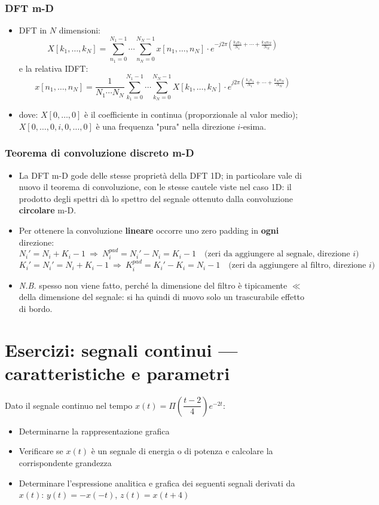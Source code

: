 \documentclass[12pt, a4paper]{article}
\begin{document}
\subsubsection{DFT m-D}
\begin{itemize}
    \item DFT in $N$ dimensioni:
    $$X[k_1,\dots,k_N] = \sum_{n_1=0}^{N_1-1}\cdots\sum_{n_N=0}^{N_N-1} x[n_1,\dots,n_N]\cdot e^{-j2\pi\left(\frac{k_1n_1}{N_1}+\cdots+\frac{k_Nn_N}{N_N}\right)}$$
    e la relativa IDFT:
    $$x[n_1,\dots,n_N] = \frac{1}{N_1\cdots N_N}\sum_{k_1=0}^{N_1-1}\cdots\sum_{k_N=0}^{N_N-1} X[k_1,\dots,k_N]\cdot e^{j2\pi\left(\frac{k_1n_1}{N_1}+\cdots+\frac{k_Nn_N}{N_N}\right)}$$
    \item dove: $X[0,\dots,0]$ è il coefficiente in continua (proporzionale al valor medio); $X[0,\dots,0,i,0,\dots,0]$ è una frequenza "pura" nella direzione $i$-esima.
\end{itemize}

\subsubsection{Teorema di convoluzione discreto m-D}
\begin{itemize}
    \item La DFT m-D gode delle stesse proprietà della DFT 1D; in particolare vale di nuovo il teorema di convoluzione, con le stesse cautele viste nel caso 1D: il prodotto degli spettri dà lo spettro del segnale ottenuto dalla convoluzione \textbf{circolare} m-D.
    \item Per ottenere la convoluzione \textbf{lineare} occorre uno zero padding in \textbf{ogni} direzione:
    $$N_i' = N_i+K_i-1 \ \Rightarrow\ N_i^{pad} = N_i'-N_i = K_i-1 \quad\text{(zeri da aggiungere al segnale, direzione $i$)}$$
    $$K_i' = N_i' = N_i+K_i-1 \ \Rightarrow\ K_i^{pad} = K_i'-K_i = N_i-1 \quad\text{(zeri da aggiungere al filtro, direzione $i$)}$$
    \item[] \textit{N.B.} spesso non viene fatto, perché la dimensione del filtro è tipicamente $\ll$ della dimensione del segnale: si ha quindi di nuovo solo un trascurabile effetto di bordo.
\end{itemize}


\section{Esercizi: segnali continui — caratteristiche e parametri}

\begin{tcolorbox}[colback=lightergray!10, colframe=tocsec, title=\textbf{Esercizio 1}]
Dato il segnale continuo nel tempo $x(t) = \Pi\!\left(\dfrac{t-2}{4}\right)e^{-2t}$:
\begin{itemize}
    \item Determinarne la rappresentazione grafica
    \item Verificare se $x(t)$ è un segnale di energia o di potenza e calcolare la corrispondente grandezza
    \item Determinare l'espressione analitica e grafica dei seguenti segnali derivati da $x(t)$: $y(t)=-x(-t)$, $z(t)=x(t+4)$
\end{itemize}
\end{tcolorbox}
\end{document}
